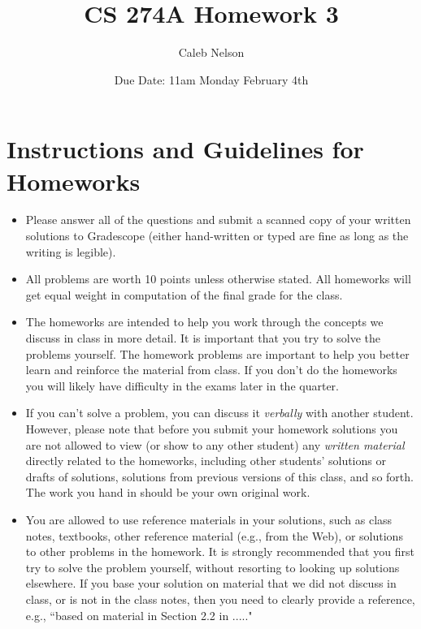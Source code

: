 \documentclass[11pt]{article}
\begin{document}
\setlength{\parskip}{1.2ex plus0.3ex minus 0.3ex}


\thispagestyle{empty} \pagestyle{myheadings} 



\title{CS 274A Homework 3}
\author{Caleb Nelson}
\date{Due Date:  11am  Monday February 4th}


\maketitle


\section*{Instructions and Guidelines for Homeworks}
 \begin{itemize}

\item
Please answer all of the questions and submit a scanned copy of your written solutions to Gradescope 
(either hand-written or typed are fine as long as the writing is legible). 

\item
All problems are worth 10 points unless otherwise stated.  All homeworks will get equal weight in computation of the final grade for the class.
 \item
The homeworks are intended to help you work through the concepts
we discuss in class in  more detail. It is important that you try
to solve the problems yourself. The homework problems are important to help you better
learn and reinforce the material from class. If you don't
do the homeworks you will likely have difficulty in the exams
later in the quarter.

\item If you can't solve a
problem, you can discuss it {\it verbally} with another student. However, please note that before you submit your homework solutions you
are not allowed to view (or show to any other student) any {\it written material} directly related to the homeworks, including other students' solutions or drafts of solutions, solutions from previous versions of this class, and so forth. The work you hand in should be your own original work.

\item You are allowed to use reference materials in your solutions, such as class notes, textbooks,  other reference material (e.g., from the Web), or solutions to other problems in the homework. It is strongly recommended that you first try to solve the problem yourself, without resorting to looking up solutions elsewhere. If you base your solution on material that we did not discuss in class, or is not in the class notes, then you need to clearly provide a reference, e.g., ``based on material in Section 2.2 in ....."



\end{itemize}
\end{document}
